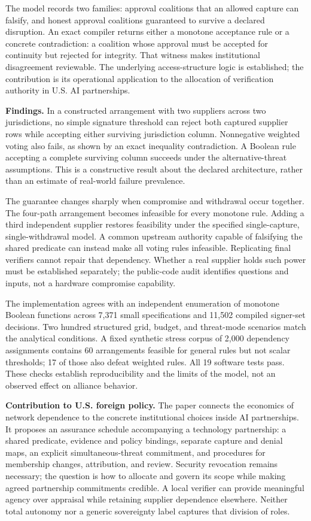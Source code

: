 \documentclass[11pt,letterpaper]{article}
\begin{document}
The model records two families: approval coalitions that an allowed capture can falsify, and honest approval coalitions guaranteed to survive a declared disruption. An exact compiler returns either a monotone acceptance rule or a concrete contradiction: a coalition whose approval must be accepted for continuity but rejected for integrity. That witness makes institutional disagreement reviewable. The underlying access-structure logic is established; the contribution is its operational application to the allocation of verification authority in U.S. AI partnerships.

\newpage
\textbf{Findings.} In a constructed arrangement with two suppliers across two jurisdictions, no simple signature threshold can reject both captured supplier rows while accepting either surviving jurisdiction column. Nonnegative weighted voting also fails, as shown by an exact inequality contradiction. A Boolean rule accepting a complete surviving column succeeds under the alternative-threat assumptions. This is a constructive result about the declared architecture, rather than an estimate of real-world failure prevalence.

The guarantee changes sharply when compromise and withdrawal occur together. The four-path arrangement becomes infeasible for every monotone rule. Adding a third independent supplier restores feasibility under the specified single-capture, single-withdrawal model. A common upstream authority capable of falsifying the shared predicate can instead make all voting rules infeasible. Replicating final verifiers cannot repair that dependency. Whether a real supplier holds such power must be established separately; the public-code audit identifies questions and inputs, not a hardware compromise capability.

The implementation agrees with an independent enumeration of monotone Boolean functions across 7,371 small specifications and 11,502 compiled signer-set decisions. Two hundred structured grid, budget, and threat-mode scenarios match the analytical conditions. A fixed synthetic stress corpus of 2,000 dependency assignments contains 60 arrangements feasible for general rules but not scalar thresholds; 17 of those also defeat weighted rules. All 19 software tests pass. These checks establish reproducibility and the limits of the model, not an observed effect on alliance behavior.

\textbf{Contribution to U.S. foreign policy.} The paper connects the economics of network dependence to the concrete institutional choices inside AI partnerships. It proposes an assurance schedule accompanying a technology partnership: a shared predicate, evidence and policy bindings, separate capture and denial maps, an explicit simultaneous-threat commitment, and procedures for membership changes, attribution, and review. Security revocation remains necessary; the question is how to allocate and govern its scope while making agreed partnership commitments credible. A local verifier can provide meaningful agency over appraisal while retaining supplier dependence elsewhere. Neither total autonomy nor a generic sovereignty label captures that division of roles.
\end{document}
